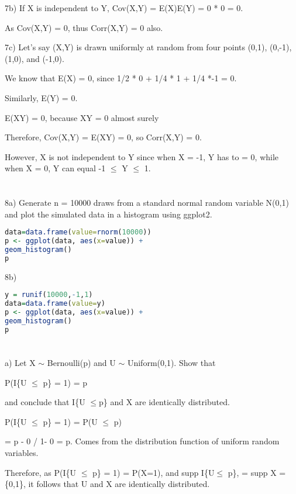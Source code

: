 7b) If X is independent to Y, Cov(X,Y) = E(X)E(Y) = 0 * 0 = 0.

As Cov(X,Y) = 0, thus Corr(X,Y) = 0 also.

7c) Let's say (X,Y) is drawn uniformly at random from four points (0,1), (0,-1), (1,0), and (-1,0).

We know that E(X) = 0, since 1/2 * 0 + 1/4 * 1 + 1/4 *-1 = 0.

Similarly, E(Y) = 0.

E(XY) = 0, because XY = 0 almost surely

Therefore, Cov(X,Y) = E(XY) = 0, so Corr(X,Y) = 0.

However, X is not independent to Y since when X = -1, Y has to = 0, while when X = 0, Y can equal -1 $\leq$ Y $\leq$ 1.

\newpage
\section{}

8a) Generate n = 10000 draws from a standard normal random variable N(0,1) and plot the simulated data in a histogram using ggplot2.

\begin{lstlisting}[language=R]
data=data.frame(value=rnorm(10000))
p <- ggplot(data, aes(x=value)) + 
geom_histogram()
p
\end{lstlisting}


8b)
\begin{lstlisting}[language=R]
y = runif(10000,-1,1)
data=data.frame(value=y)
p <- ggplot(data, aes(x=value)) + 
geom_histogram()
p
\end{lstlisting}

\newpage
\section{}

a) Let X $\sim$ Bernoulli(p) and U $\sim$ Uniform(0,1). Show that

P(I{\{U $\leq$ p}\} = 1) = p

and conclude that I\{U $\leq$p\} and X are identically distributed. 

P(I{\{U $\leq$ p}\} = 1) = P(U $\leq$ p)

= p - 0 / 1- 0  = p. Comes from the distribution function of uniform random variables.

Therefore, as P(I{\{U $\leq$ p}\} = 1) = P(X=1), and supp I\{U$\leq$ p\}, = supp X = \{0,1\}, it follows that U and X are identically distributed.

